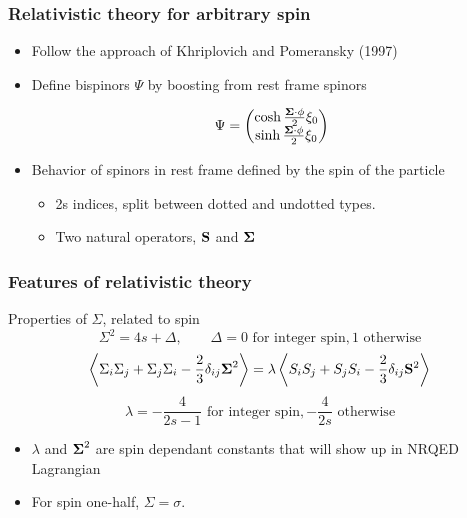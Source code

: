 \documentclass[11ppt]{beamer}
\newcommand{\beq}{\begin{equation*} }
\newcommand{\eeq}{\end{equation*} }
\begin{document}
\begin{frame}
\frametitle{Relativistic theory for arbitrary spin}

\begin{itemize}
\item Follow the approach of Khriplovich and Pomeransky (1997)
\item Define bispinors $\Psi$ by boosting from rest frame spinors

\[	\Psi = \begin{pmatrix} 	\cosh{ \frac{\ensuremath{\mathbf{\Sigma}} \cdot \phi}{2} }  \xi_0\\ 
				\sinh{ \frac{\ensuremath{\mathbf{\Sigma}} \cdot \phi}{2} }  \xi_0
		\end{pmatrix}
\]
\item Behavior of spinors in rest frame defined by the spin of the particle
\begin{itemize}
	\item 2s indices, split between dotted and undotted types.
	\item Two natural operators, $\mathbf{S}$ and $\mathbf{\Sigma}$
\end{itemize}


\end{itemize}

\end{frame}


\begin{frame}
\frametitle{Features of relativistic theory}

  \begin{block}{ Properties of $\Sigma$, related to spin}
  	\footnotesize	\beq 	\Sigma^2	=	4s + \Delta, \hspace{2em} \Delta = 0 \text{ for integer spin}, 1 \text{ otherwise}\eeq
  	\beq \avg{\Sigma_i \Sigma_j + \Sigma_j \Sigma_i - \frac{2}{3} \delta_{ij} \gv{\Sigma}^2}
		=	\lambda \avg{ S_i S_j + S_j S_i - \frac{2}{3} \delta_{ij} \v{S}^2  }	\eeq
	\beq \lambda =-\frac{4}{2s-1} \text{ for integer spin}, -\frac{4}{2s} \text{ otherwise} \eeq	\normalsize
  \end{block}
\begin{itemize}
  \item $\lambda$ and $\mbox{\boldmath$ \Sigma $}^2$ are spin dependant constants that will show up in NRQED Lagrangian
  \item For spin one-half, $\Sigma = \sigma$.

\end{itemize}


\end{frame}
\end{document}
